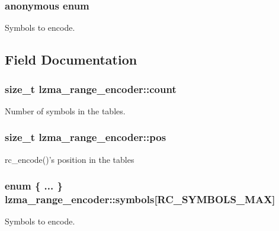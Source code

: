\subsubsection[{anonymous enum}]{\setlength{\rightskip}{0pt plus 5cm}anonymous enum}\label{structlzma__range__encoder_ac1868ed1d397716e3a8b3f72c36b5b0b}


Symbols to encode. 



\subsection{Field Documentation}
\subsubsection[{count}]{\setlength{\rightskip}{0pt plus 5cm}size\-\_\-t lzma\-\_\-range\-\_\-encoder\-::count}\label{structlzma__range__encoder_ab1b7f905ce76607567a5823d04e98404}


Number of symbols in the tables. 

\subsubsection[{pos}]{\setlength{\rightskip}{0pt plus 5cm}size\-\_\-t lzma\-\_\-range\-\_\-encoder\-::pos}\label{structlzma__range__encoder_af4b8146a2e4a06d6e5d3a6d7ab56dd31}


rc\-\_\-encode()'s position in the tables 

\subsubsection[{symbols}]{\setlength{\rightskip}{0pt plus 5cm}enum \{ ... \}   lzma\-\_\-range\-\_\-encoder\-::symbols[{\bf R\-C\-\_\-\-S\-Y\-M\-B\-O\-L\-S\-\_\-\-M\-A\-X}]}\label{structlzma__range__encoder_a0291de7bf4d3faebc4e583a2201bc8b1}


Symbols to encode. 

